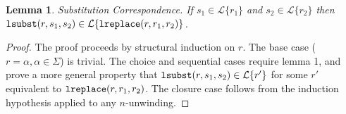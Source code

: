 \documentclass{acm_proc_article-sp}
\newtheorem{lem}[thm]{Lemma}
\theoremstyle{definition}
\newcommand{\Lagr}{\mathcal{L}}
\newcommand{\lang}[1]{\Lagr\{#1\}}
\newcommand{\iso}{\cong}
\newcommand{\lsubst}[3]{{\tt lsubst}(#1,#2,#3)} %
\newcommand{\lreplace}[3]{{\tt lreplace}(#1, #2, #3)}
\begin{document}
\begin{lem}{Substitution Correspondence.} \label{thm:substcorrespondence}
If $s_1 \in \lang{r_1}$ and $s_2 \in \lang{r_2}$ then $\lsubst{r}{s_1}{s_2} \in \lang{\lreplace{r}{r_1}{r_2}}$.
\end{lem}
\begin{proof}
The proof proceeds by structural induction on $r$.
The base case ($r=\alpha, \alpha \in \Sigma$) is trivial.
The choice and sequential cases require lemma 1, and prove a more general property that $\lsubst{r}{s_1}{s_2} \in \lang{r'}$ for some $r'$ equivalent to $\lreplace{r}{r_1}{r_2}$.
The closure case follows from the induction hypothesis applied to any $n$-unwinding.

%
%
%
\end{proof}
\end{document}
